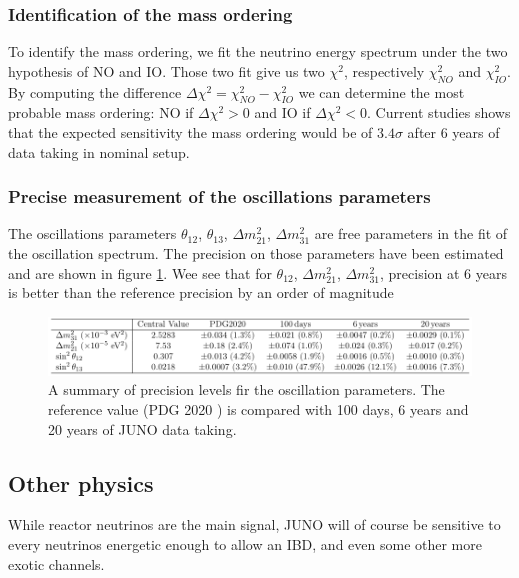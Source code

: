 \subsubsection{Identification of the mass ordering}

To identify the mass ordering, we fit the neutrino energy spectrum under the two hypothesis of NO and IO. Those two fit give us two $\chi^2$, respectively $\chi^2_{NO}$ and $\chi^2_{IO}$. By computing the difference $\Delta \chi ^2 = \chi^2_{NO} - \chi^2_{IO}$ we can determine the most probable mass ordering: NO if $\Delta \chi^2 > 0$ and IO if $\Delta \chi^2 < 0$. Current studies shows that the expected sensitivity the mass ordering would be of $3.4 \sigma$ after 6 years of data taking in nominal setup\cite{an_neutrino_2016}.

\subsubsection{Precise measurement of the oscillations parameters}

The oscillations parameters $\theta_{12}$, $\theta_{13}$, $\Delta m^2_{21}$, $\Delta m^2_{31}$ are free parameters in the fit of the oscillation spectrum. The precision on those parameters have been estimated and are shown in figure \ref{fig:juno-param-precision}. Wee see that for $\theta_{12}$, $\Delta m^2_{21}$, $\Delta m^2_{31}$, precision at 6 years is better than the reference precision by an order of magnitude \cite{juno_collaboration_sub-percent_2022}

\begin{figure}[hb]
  \centering
  \includegraphics[width=\linewidth]{images/juno/oscillation_params_precision.png}
  \caption{A summary of precision levels fir the oscillation parameters. The reference value (PDG 2020 \cite{pdg2020}) is compared with 100 days, 6 years and 20 years of JUNO data taking.}
  \label{fig:juno-param-precision}
\end{figure}

\subsection{Other physics}

While reactor neutrinos are the main signal, JUNO will of course be sensitive to every neutrinos energetic enough to allow an IBD, and even some other more exotic channels.

